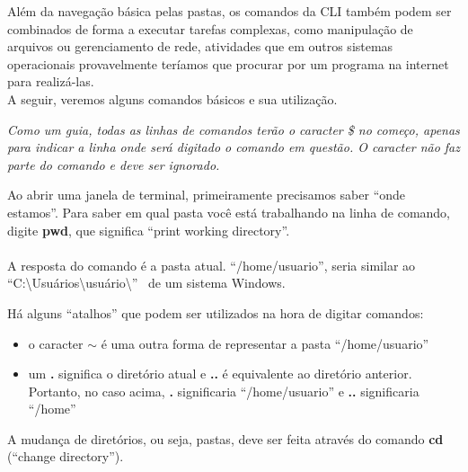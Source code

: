 \documentclass{handout_utfpr}
\newcommand{\com}[1]{
\colorbox{light-gray}{\texttt{\pbox{\textwidth}{\$ #1}}}
}
\newcommand{\cominline}[1]{
\colorbox{light-gray}{\texttt{\pbox{\textwidth}{#1}}}
}
\begin{document}
Além da navegação básica pelas pastas, os comandos da CLI também podem ser combinados de forma a executar tarefas complexas, como manipulação de arquivos ou gerenciamento de rede, atividades que em outros sistemas operacionais provavelmente teríamos que procurar por um programa na internet para realizá-las.\\

A seguir, veremos alguns comandos básicos e sua utilização.


{\small \it Como um guia, todas as linhas de comandos terão o caracter \$ no começo, apenas para indicar a linha onde será digitado o comando em questão. O caracter não faz parte do comando e deve ser ignorado.\\}

Ao abrir uma janela de terminal, primeiramente precisamos saber ``onde estamos''. Para saber em qual pasta você está trabalhando na linha de comando, digite \textbf{pwd}, que significa ``print working directory''.\\

\com{pwd\\/home/usuario}\\

A resposta do comando é a pasta atual. ``/home/usuario'', seria similar ao ``C:\textbackslash Usuários\textbackslash usuário\textbackslash'' \  de um sistema Windows.

Há alguns ``atalhos'' que podem ser utilizados na hora de digitar comandos:
\begin{itemize}
\item o caracter \textbf{$\sim$} é uma outra forma de representar a pasta ``/home/usuario''
\item um \textbf{.} significa o diretório atual e \textbf{..} é equivalente ao diretório anterior. Portanto, no caso acima, \textbf{.} significaria ``/home/usuario'' e \textbf{..} significaria ``/home''
\end{itemize}
A mudança de diretórios, ou seja, pastas, deve ser feita através do comando \textbf{cd} (``change directory'').
\end{document}
